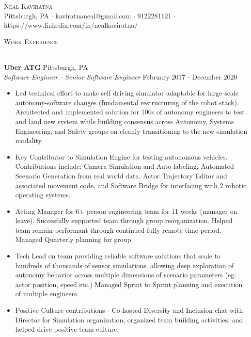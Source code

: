 \documentclass[a4paper]{article}
\newcommand{\lineunder} {
    \vspace*{-8pt} \\
    \hspace*{-18pt} \hrulefill \\
}
\newcommand{\header} [1] {
    {\hspace*{-18pt}\vspace*{6pt} \textsc{#1}}
    \vspace*{-6pt} \lineunder
}
\begin{document}
\vspace*{-40pt}

    

\vspace*{-10pt}
\begin{center}
	{\Huge \scshape {Neal Kaviratna}}\\
	Pittsburgh, PA $\cdot$ kaviratnaneal@gmail.com $\cdot$ 9122281121 $\cdot$ https://www.linkedin.com/in/nealkaviratna/\\
\end{center}

\header{Work Experience}
\vspace{1mm}

\textbf{Uber ATG} \hfill Pittsburgh, PA\\
\textit{Software Engineer - Senior Software Engineer} \hfill February 2017 - December 2020\\
\vspace{-1mm}
\begin{itemize} \itemsep 1pt
	\item Led technical effort to make self driving simulator adaptable for large scale autonomy-software changes (fundamental restructuring of the robot stack). Architected and implemented solution for 100s of autonomy engineers to test and land new system while building consensus across Autonomy, Systems Engineering, and Safety groups on cleanly transitioning to the new simulation modality.
	\item Key Contributor to Simulation Engine for testing autonomous vehicles. Contributions include: Camera Simulation and Auto-labeling, Automated Scenario Generation from real world data, Actor Trajectory Editor and associated movement code, and Software Bridge for interfacing with 2 robotic operating systems.
	\item Acting Manager for 6+ person engineering team for 11 weeks (manager on leave). Succesfully supported team through group reorganization. Helped team remain performant through continued fully remote time period. Managed Quarterly planning for group.
	\item Tech Lead on team providing reliable software solutions that scale to hundreds of thousands of sensor simulations, allowing deep exploration of autonomy behavior across multiple dimensions of scenario parameters (eg: actor position, speed etc.) Managed Sprint to Sprint planning and execution of multiple engineers.
	\item Positive Culture contributions - Co-hosted Diversity and Inclusion chat with Director for Simulation organization, organized team building activities, and helped drive positive team culture.
\end{itemize}
\end{document}
